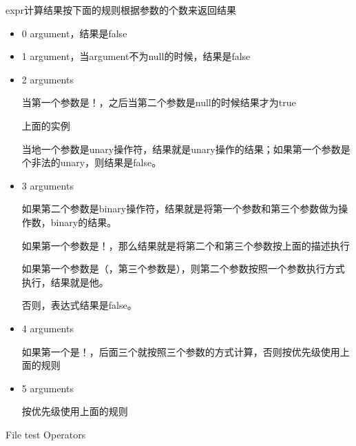 expr计算结果按下面的规则根据参数的个数来返回结果
\begin{itemize}
\item 0 argument，结果是false
\item 1 argument，当argument不为null的时候，结果是false
\item 2 arguments

当第一个参数是！，之后当第二个参数是null的时候结果才为true

\begin{Command-Line}

上面的实例

\end{Command-Line}

当地一个参数是unary操作符，结果就是unary操作的结果；如果第一个参数是个非法的unary，则结果是false。


\item 3 arguments 

如果第二个参数是binary操作符，结果就是将第一个参数和第三个参数做为操作数，binary的结果。

如果第一个参数是！，那么结果就是将第二个和第三个参数按上面的描述执行

如果第一个参数是（，第三个参数是），则第二个参数按照一个参数执行方式执行，结果就是他。

否则，表达式结果是false。

\item 4 arguments

如果第一个是！，后面三个就按照三个参数的方式计算，否则按优先级使用上面的规则

\item 5 arguments

按优先级使用上面的规则

\end{itemize} 


File test Operators

